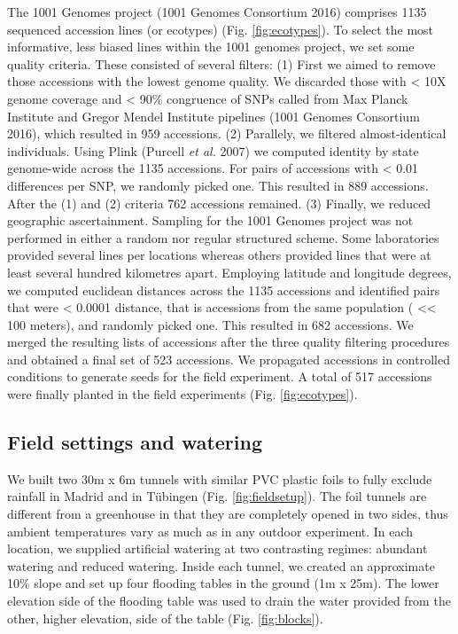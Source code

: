 \documentclass[12pt,]{article}
\begin{document}
The 1001 Genomes project (1001 Genomes Consortium 2016) comprises 1135
sequenced accession lines (or ecotypes) (Fig. \ref{fig:ecotypes}). To
select the most informative, less biased lines within the 1001 genomes
project, we set some quality criteria. These consisted of several
filters: (1) First we aimed to remove those accessions with the lowest
genome quality. We discarded those with \textless{} 10X genome coverage
and \textless{} 90\% congruence of SNPs called from Max Planck Institute
and Gregor Mendel Institute pipelines (1001 Genomes Consortium 2016),
which resulted in 959 accessions. (2) Parallely, we filtered
almost-identical individuals. Using Plink (Purcell \emph{et al.} 2007)
we computed identity by state genome-wide across the 1135 accessions.
For pairs of accessions with \textless{} 0.01 differences per SNP, we
randomly picked one. This resulted in 889 accessions. After the (1) and
(2) criteria 762 accessions remained. (3) Finally, we reduced geographic
ascertainment. Sampling for the 1001 Genomes project was not performed
in either a random nor regular structured scheme. Some laboratories
provided several lines per locations whereas others provided lines that
were at least several hundred kilometres apart. Employing latitude and
longitude degrees, we computed euclidean distances across the 1135
accessions and identified pairs that were \textless{} 0.0001 distance,
that is accessions from the same population ( \textless{}\textless{} 100
meters), and randomly picked one. This resulted in 682 accessions. We
merged the resulting lists of accessions after the three quality
filtering procedures and obtained a final set of 523 accessions. We
propagated accessions in controlled conditions to generate seeds for the
field experiment. A total of 517 accessions were finally planted in the
field experiments (Fig. \ref{fig:ecotypes}).

\subsection{Field settings and
watering}\label{field-settings-and-watering}

We built two 30m x 6m tunnels with similar PVC plastic foils to fully
exclude rainfall in Madrid and in Tübingen (Fig. \ref{fig:fieldsetup}).
The foil tunnels are different from a greenhouse in that they are
completely opened in two sides, thus ambient temperatures vary as much
as in any outdoor experiment. In each location, we supplied artificial
watering at two contrasting regimes: abundant watering and reduced
watering. Inside each tunnel, we created an approximate 10\% slope and
set up four flooding tables in the ground (1m x 25m). The lower
elevation side of the flooding table was used to drain the water
provided from the other, higher elevation, side of the table (Fig.
\ref{fig:blocks}).
\end{document}
